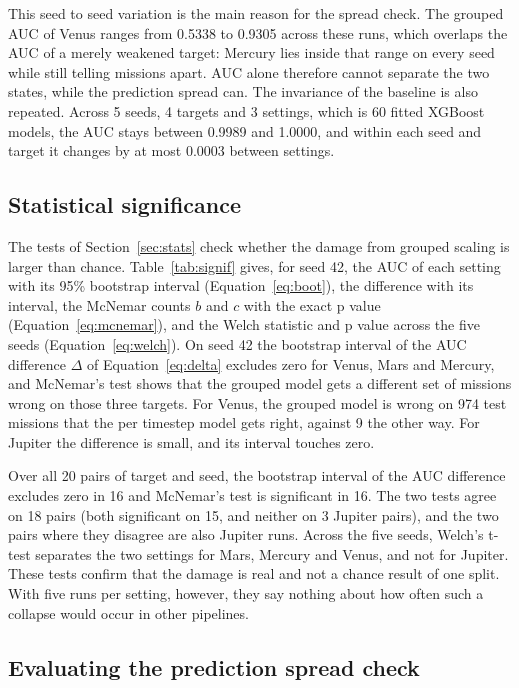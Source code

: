 This seed to seed variation is the main reason for the spread check. The grouped AUC of Venus ranges from 0.5338 to 0.9305 across these runs, which overlaps the AUC of a merely weakened target: Mercury lies inside that range on every seed while still telling missions apart. AUC alone therefore cannot separate the two states, while the prediction spread can. The invariance of the baseline is also repeated. Across 5 seeds, 4 targets and 3 settings, which is 60 fitted XGBoost models, the AUC stays between 0.9989 and 1.0000, and within each seed and target it changes by at most 0.0003 between settings.

\subsection{Statistical significance}
\label{sec:signif}

The tests of Section~\ref{sec:stats} check whether the damage from grouped scaling is larger than chance. Table~\ref{tab:signif} gives, for seed 42, the AUC of each setting with its 95\% bootstrap interval (Equation~\ref{eq:boot}), the difference with its interval, the McNemar counts $b$ and $c$ with the exact p value (Equation~\ref{eq:mcnemar}), and the Welch statistic and p value across the five seeds (Equation~\ref{eq:welch}). On seed 42 the bootstrap interval of the AUC difference $\Delta$ of Equation~\ref{eq:delta} excludes zero for Venus, Mars and Mercury, and McNemar's test shows that the grouped model gets a different set of missions wrong on those three targets. For Venus, the grouped model is wrong on 974 test missions that the per timestep model gets right, against 9 the other way. For Jupiter the difference is small, and its interval touches zero.


Over all 20 pairs of target and seed, the bootstrap interval of the AUC difference excludes zero in 16 and McNemar's test is significant in 16. The two tests agree on 18 pairs (both significant on 15, and neither on 3 Jupiter pairs), and the two pairs where they disagree are also Jupiter runs. Across the five seeds, Welch's t-test separates the two settings for Mars, Mercury and Venus, and not for Jupiter. These tests confirm that the damage is real and not a chance result of one split. With five runs per setting, however, they say nothing about how often such a collapse would occur in other pipelines.

\subsection{Evaluating the prediction spread check}
\label{sec:check}

